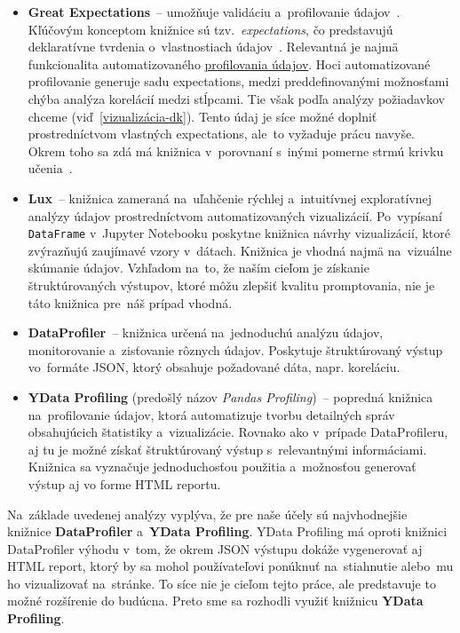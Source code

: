 \begin{itemize}
\item \textbf{Great Expectations}~-- umožňuje validáciu a~profilovanie údajov~\cite{great-expectations}. Kľúčovým konceptom knižnice sú tzv.~\textit{expectations}, čo predstavujú deklaratívne tvrdenia o~vlastnostiach údajov~\cite{expectations}. Relevantná je najmä funkcionalita automatizovaného \href{https://legacy.017.docs.greatexpectations.io/docs/0.15.50/#automated-data-profiling}{profilovania údajov}. Hoci automatizované profilovanie generuje sadu expectations, medzi preddefinovanými možnosťami chýba analýza korelácií medzi stĺpcami. Tie však podľa analýzy požiadavkov chceme (viď~\ref{vizualizácia-dk}). Tento údaj je síce možné doplniť prostredníctvom vlastných expectations, ale~to vyžaduje prácu navyše. Okrem toho sa zdá má knižnica v~porovnaní s~inými pomerne strmú krivku učenia~\cite{learning-curve}.

\item \textbf{Lux}~-- knižnica zameraná na~uľahčenie rýchlej a~intuitívnej exploratívnej analýzy údajov prostredníctvom automatizovaných vizualizácií. Po~vypísaní \texttt{DataFrame} v~Jupyter Notebooku poskytne knižnica návrhy vizualizácií, ktoré zvýrazňujú zaujímavé vzory v~dátach. Knižnica je vhodná najmä na~vizuálne skúmanie údajov. Vzhľadom na~to, že naším cieľom je získanie štruktúrovaných výstupov, ktoré môžu zlepšiť kvalitu promptovania, nie je táto knižnica pre~náš prípad vhodná.

\item \textbf{DataProfiler}~-- knižnica určená na~jednoduchú analýzu údajov, monitorovanie a~zisťovanie rôznych údajov. Poskytuje štruktúrovaný výstup vo~formáte JSON, ktorý obsahuje požadované dáta, napr. koreláciu.

\item \textbf{YData Profiling} (predošlý názov \textit{Pandas Profiling})~-- popredná knižnica na~profilovanie údajov, ktorá automatizuje tvorbu detailných správ obsahujúcich štatistiky a~vizualizácie. Rovnako ako v~prípade DataProfileru, aj tu je možné získať štruktúrovaný výstup s~relevantnými informáciami. Knižnica sa vyznačuje jednoduchosťou použitia a~možnosťou generovať výstup aj vo forme HTML reportu.
\end{itemize}

Na~základe uvedenej analýzy vyplýva, že pre naše účely sú najvhodnejšie knižnice \textbf{DataProfiler} a~\textbf{YData Profiling}. YData Profiling má oproti knižnici DataProfiler výhodu v~tom, že okrem JSON výstupu dokáže vygenerovať aj HTML report, ktorý by sa mohol používateľovi ponúknuť na~stiahnutie alebo~mu ho vizualizovať na~stránke. To síce nie je cieľom tejto práce, ale predstavuje to možné rozšírenie do budúcna. Preto sme sa rozhodli využiť knižnicu \textbf{YData Profiling}.

